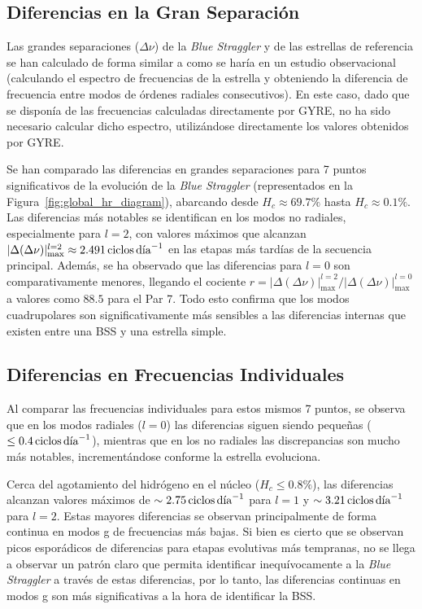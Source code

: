 \subsection{Diferencias en la Gran Separación}

Las grandes separaciones ($\Delta\nu$) de la \textit{Blue Straggler} y de las estrellas de referencia se han calculado de forma similar a como se haría en un estudio observacional (calculando el espectro de frecuencias de la estrella y obteniendo la diferencia de frecuencia entre modos de órdenes radiales consecutivos). En este caso, dado que se disponía de las frecuencias calculadas directamente por GYRE, no ha sido necesario calcular dicho espectro, utilizándose directamente los valores obtenidos por GYRE.

Se han comparado las diferencias en grandes separaciones para 7 puntos significativos de la evolución de la \textit{Blue Straggler} (representados en la Figura~\ref{fig:global_hr_diagram}), abarcando desde $H_c \approx 69.7\%$ hasta $H_c \approx 0.1\%$. Las diferencias más notables se identifican en los modos no radiales, especialmente para $l=2$, con valores máximos que alcanzan $|\Delta(\Delta\nu)|_{\max}^{l=2} \approx 2.491\,\text{ciclos\,día}^{-1}$ en las etapas más tardías de la secuencia principal. Además, se ha observado que las diferencias para $l=0$ son comparativamente menores, llegando el cociente $r = |\Delta(\Delta\nu)|_{\max}^{l=2} / |\Delta(\Delta\nu)|_{\max}^{l=0}$ a valores como $88.5$ para el Par 7. Todo esto confirma que los modos cuadrupolares son significativamente más sensibles a las diferencias internas que existen entre una BSS y una estrella simple.

\subsection{Diferencias en Frecuencias Individuales}

Al comparar las frecuencias individuales para estos mismos 7 puntos, se observa que en los modos radiales ($l=0$) las diferencias siguen siendo pequeñas ($\le 0.4\,\text{ciclos\,día}^{-1}$), mientras que en los no radiales las discrepancias son mucho más notables, incrementándose conforme la estrella evoluciona.

Cerca del agotamiento del hidrógeno en el núcleo ($H_c \le 0.8\%$), las diferencias alcanzan valores máximos de $\sim 2.75\,\text{ciclos\,día}^{-1}$ para $l=1$ y $\sim 3.21\,\text{ciclos\,día}^{-1}$ para $l=2$. Estas mayores diferencias se observan principalmente de forma continua en modos g de frecuencias más bajas. Si bien es cierto que se observan picos esporádicos de diferencias para etapas evolutivas más tempranas, no se llega a observar un patrón claro que permita identificar inequívocamente a la \textit{Blue Straggler} a través de estas diferencias, por lo tanto, las diferencias continuas en modos g son más significativas a la hora de identificar la BSS.


